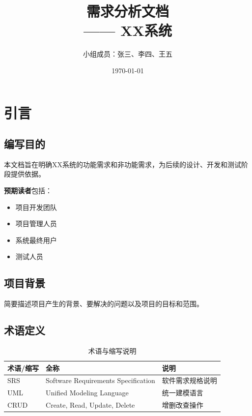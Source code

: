 \documentclass[12pt,a4paper]{ctexart}
\title{\heiti 需求分析文档 \\[6pt] \large —— XX系统}          %
\author{\songti 小组成员：张三、李四、王五}                     %
\date{\today}
\begin{document}
\maketitle
\thispagestyle{empty}
\newpage

\tableofcontents
\newpage

\section{引言}
\subsection{编写目的}
本文档旨在明确XX系统的功能需求和非功能需求，为后续的设计、开发和测试阶段提供依据。

\textbf{预期读者}包括：
\begin{itemize}
    \item 项目开发团队
    \item 项目管理人员
    \item 系统最终用户
    \item 测试人员
\end{itemize}

\subsection{项目背景}
简要描述项目产生的背景、要解决的问题以及项目的目标和范围。

\subsection{术语定义}
\begin{table}[H]
\centering
\caption{术语与缩写说明}
\begin{tabular}{lll}
\toprule
\textbf{术语/缩写} & \textbf{全称} & \textbf{说明} \\
\midrule
SRS & Software Requirements Specification & 软件需求规格说明 \\
UML & Unified Modeling Language & 统一建模语言 \\
CRUD & Create, Read, Update, Delete & 增删改查操作 \\
\bottomrule
\end{tabular}
\end{table}
\end{document}
